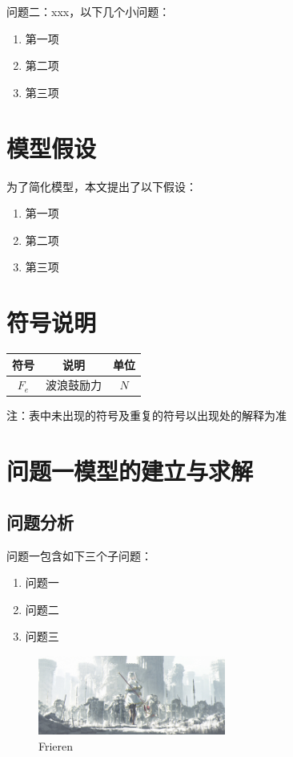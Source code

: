 \documentclass[12pt,a4paper]{article}
\numberwithin{figure}{subsection}
\numberwithin{figure}{subsection}
\begin{document}
问题二：xxx，以下几个小问题：
\begin{enumerate}[itemsep=-0.2em,topsep=0em]
  \item 第一项
  \item 第二项
  \item 第三项
\end{enumerate}

\section{模型假设}
为了简化模型，本文提出了以下假设：
\begin{enumerate}[itemsep=-0.2em,topsep=0em]
  \item 第一项
  \item 第二项
  \item 第三项
\end{enumerate}

\section{符号说明}
\vspace{-1em}
\begin{table}[H]
  \centering
  \label{tab:符号说明} %
  \begin{tabular}{c c c} %
      \hline
      符号 & 说明 & 单位 \\ \hline
      $F_e$ & 波浪鼓励力 & $N$ \\ \hline
  \end{tabular}
\end{table}
注：表中未出现的符号及重复的符号以出现处的解释为准

\section{问题一模型的建立与求解}
\subsection{问题分析}
问题一包含如下三个子问题：
\begin{enumerate}[itemsep=-0.2em,topsep=0em]
  \item 问题一
  \item 问题二
  \item 问题三
\end{enumerate}
\begin{figure}[H]%
  \centering
  \includegraphics[width = 0.55\textwidth]{figures/Frieren.jpg}
  \caption{Frieren}
  \label{img:Frieren}    
\end{figure}
\end{document}
